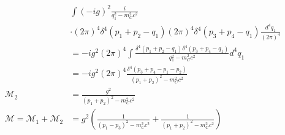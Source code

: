 \documentclass{article}
\begin{document}
\begin{equation}
    \begin{split}
        & \int \left(-ig\right)^2 \frac{i}{q_1^2 - m_C^2c^2} \\
        & \cdot \left(2\pi\right)^4\delta^4\left(p_1 + p_2 - q_1\right)\left(2\pi\right)^4\delta^4\left(p_3 + p_4 - q_1\right) \frac{d^4q_1}{(2\pi)^4} \\
        & = -ig^2\left(2\pi\right)^4 \int \frac{\delta^4\left(p_1 + p_2 - q_1\right)\delta^4\left(p_3 + p_4 - q_1\right)}{q_1^2 - m_C^2c^2}  d^4q_1 \\
        & = -ig^2\left(2\pi\right)^4 \frac{\delta^4\left(p_3 + p_4 - p_1 - p_2\right)}{\left(p_1 + p_2\right)^2 - m_C^2c^2}  \\
        \mathcal{M}_2 & = \frac{g^2}{\left(p_1 + p_2\right)^2 - m_C^2c^2} \\
        \mathcal{M} = \mathcal{M}_1 + \mathcal{M}_2 & = g^2\left(\frac{1}{\left(p_1 - p_3\right)^2 - m_C^2c^2} + \frac{1}{\left(p_1 + p_2\right)^2 - m_C^2c^2}\right)
    \end{split}
\end{equation}
\end{document}

